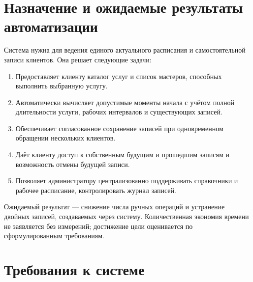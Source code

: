 \section{Назначение и ожидаемые результаты автоматизации}
Система нужна для ведения единого актуального расписания и самостоятельной записи клиентов. Она решает следующие задачи:
\begin{enumerate}
\item Предоставляет клиенту каталог услуг и список мастеров, способных выполнить выбранную услугу.
\item Автоматически вычисляет допустимые моменты начала с учётом полной длительности услуги, рабочих интервалов и существующих записей.
\item Обеспечивает согласованное сохранение записей при одновременном обращении нескольких клиентов.
\item Даёт клиенту доступ к собственным будущим и прошедшим записям и возможность отмены будущей записи.
\item Позволяет администратору централизованно поддерживать справочники и рабочее расписание, контролировать журнал записей.
\end{enumerate}
Ожидаемый результат --- снижение числа ручных операций и устранение двойных записей, создаваемых через систему. Количественная экономия времени не заявляется без измерений; достижение цели оценивается по сформулированным требованиям.

\section{Требования к системе}
